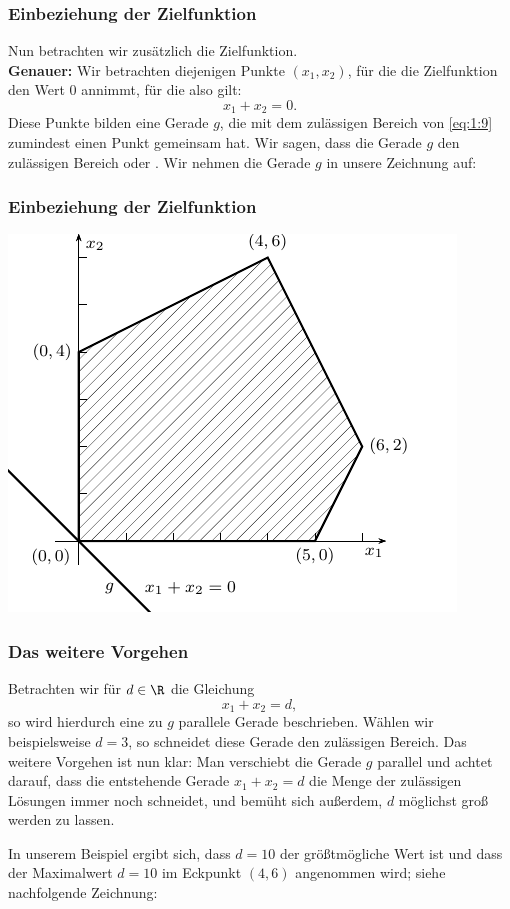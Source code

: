 \documentclass[smaller]{beamer}
\begin{document}
\begin{frame}
 \frametitle{Einbeziehung der Zielfunktion}
  Nun betrachten wir zusätzlich die Zielfunktion. \\
  \vspace*{0.2cm}
  \textbf{Genauer:} Wir betrachten diejenigen Punkte $(x_1,x_2)$, für die die Zielfunktion den Wert 0 annimmt, für die also gilt:
\[
x_1+x_2 = 0.
\]
Diese Punkte bilden eine Gerade $g$, die mit dem zulässigen Bereich von \eqref{eq:1:9} zumindest einen Punkt gemeinsam hat. Wir sagen, dass die Gerade $g$ den zulässigen Bereich  oder . Wir nehmen die Gerade $g$ in unsere Zeichnung auf:
\end{frame}

\begin{frame}
 \frametitle{Einbeziehung der Zielfunktion}
 \begin{center}
\includegraphics{fig3.pdf}
\end{center}
\end{frame}

\begin{frame}
 \frametitle{Das weitere Vorgehen}
 Betrachten wir für $d \in \R$ die Gleichung
\[
x_1 + x_2 = d,
\]
so wird hierdurch eine zu $g$ parallele Gerade beschrieben. Wählen wir beispielsweise $d=3$, so schneidet diese Gerade den zulässigen Bereich. Das weitere Vorgehen ist nun klar: Man verschiebt die Gerade $g$ parallel und achtet darauf, dass die entstehende Gerade $x_1+x_2=d$ die Menge der zulässigen Lösungen immer noch schneidet, und bemüht sich außerdem, $d$ möglichst groß werden zu lassen.

In unserem Beispiel ergibt sich, dass $d=10$ der größtmögliche Wert ist und dass der Maximalwert $d=10$ im Eckpunkt $(4,6)$ angenommen wird; siehe nachfolgende Zeichnung:
\end{frame}
\end{document}
